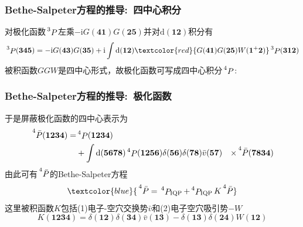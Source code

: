 {\frame
{
	\frametitle{\textrm{Bethe-Salpeter}方程的推导:~四中心积分}
	对极化函数$\sideset{^3}{}{\mathop{P}}$左乘$-\mathrm{i}G(\mathbf{41})G(\mathbf{25})$并对$\mathrm{d}(\mathbf{12})$积分有
	\begin{displaymath}
		\sideset{^3}{}{\mathop{P}}(\mathbf{345})=-\mathrm{i}G(\mathbf{43})G(\mathbf{35})+\mathrm{i}\int\mathrm{d}(\mathbf{12})\textcolor{red}{G(\mathbf{41})G(\mathbf{25})W(\mathbf{1}^{+}\mathbf{2})}\sideset{^3}{}{\mathop{P}}(\mathbf{312})
	\end{displaymath}
	被积函数$GGW$是四中心形式，故极化函数可写成四中心积分$\sideset{^4}{}{\mathop{P}}$:\\
	{\fontsize{8.0pt}{6.2pt}}
}

\frame
{
	\frametitle{\textrm{Bethe-Salpeter}方程的推导:~极化函数}
	于是屏蔽极化函数的四中心表示为
	\begin{displaymath}
		\begin{aligned}
			\sideset{^4}{}{\mathop{\bar{P}}}(\mathbf{1234})=&\sideset{^4}{}{\mathop{P}}(\mathbf{1234})\\
			&+\int\mathrm{d}(\mathbf{5678})\sideset{^4}{}{\mathop{P}}(\mathbf{1256})\delta(\mathbf{56})\delta(\mathbf{78})\bar{v}(\mathbf{57})
			&\times\sideset{^4}{}{\mathop{\bar{P}}}(\mathbf{7834})
		\end{aligned}
	\end{displaymath}
	由此可有$\sideset{^4}{}{\mathop{\bar{P}}}$的\textrm{Bethe-Salpeter}方程
	\begin{displaymath}
		\textcolor{blue}{\sideset{^4}{}{\mathop{\bar{P}}}=\sideset{^4}{_{\mathrm{IQP}}}{\mathop{P}}+\sideset{^4}{_{\mathrm{IQP}}}{\mathop{P}}K\sideset{^4}{}{\mathop{\bar{P}}}}
	\end{displaymath}
	这里被积函数$K$包括(1)电子-空穴交换势$\bar{v}$和(2)电子空穴吸引势$-W$
	\begin{displaymath}
		K(\mathbf{1234})=\delta(\mathbf{12})\delta(\mathbf{34})\bar{v}(\mathbf{13})-\delta(\mathbf{13})\delta(\mathbf{24})W(\mathbf{12})
	\end{displaymath}
}

}
